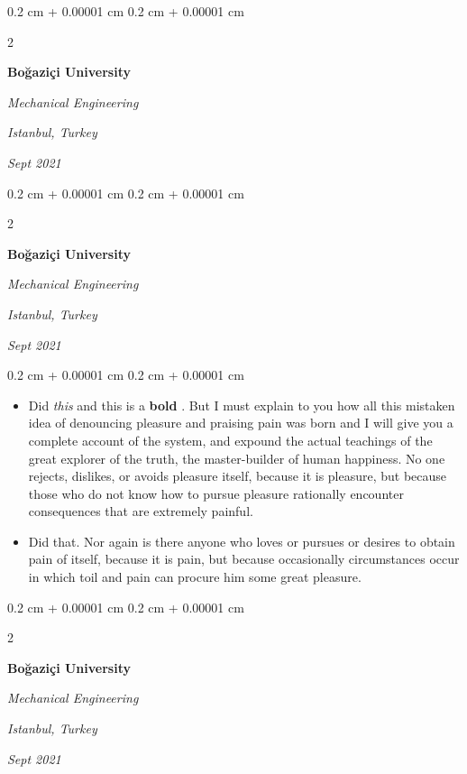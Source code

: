 \documentclass[10pt, letterpaper]{article}
\newenvironment{highlights}{
    \begin{itemize}[
        topsep=0.10 cm,
        parsep=0.10 cm,
        partopsep=0pt,
        itemsep=0pt,
        leftmargin=0.4 cm + 10pt
    ]
}{
    \end{itemize}
} %
\newenvironment{onecolentry}{
    \begin{adjustwidth}{
        0.2 cm + 0.00001 cm
    }{
        0.2 cm + 0.00001 cm
    }
}{
    \end{adjustwidth}
} %
\newenvironment{twocolentry}[2][]{
    \onecolentry
    \def\secondColumn{#2}
    \setcolumnwidth{\fill, 4.5 cm}
    \begin{paracol}{2}
}{
    \switchcolumn \raggedleft \secondColumn
    \end{paracol}
    \endonecolentry
} %
\let\hrefWithoutArrow\href
\renewcommand{\href}[2]{\hrefWithoutArrow{#1}{\ifthenelse{\equal{#2}{}}{ }{#2 }\raisebox{.15ex}{\footnotesize \faExternalLink*}}}
\begin{document}
        \vspace{0.2 cm}

        \begin{twocolentry}{
        \textit{Istanbul, Turkey}    
            
        \textit{Sept 2021}}
            \textbf{Boğaziçi University}

            \textit{Mechanical Engineering}
        \end{twocolentry}



        \vspace{0.2 cm}

        \begin{twocolentry}{
        \textit{Istanbul, Turkey}    
            
        \textit{Sept 2021}}
            \textbf{Boğaziçi University}

            \textit{Mechanical Engineering}
        \end{twocolentry}

        \vspace{0.10 cm}
        \begin{onecolentry}
            \begin{highlights}
                \item Did \textit{this} and this is a \textbf{bold} \href{https://example.com}{link}. But I must explain to you how all this mistaken idea of denouncing pleasure and praising pain was born and I will give you a complete account of the system, and expound the actual teachings of the great explorer of the truth, the master-builder of human happiness. No one rejects, dislikes, or avoids pleasure itself, because it is pleasure, but because those who do not know how to pursue pleasure rationally encounter consequences that are extremely painful.
                \item Did that. Nor again is there anyone who loves or pursues or desires to obtain pain of itself, because it is pain, but because occasionally circumstances occur in which toil and pain can procure him some great pleasure.
            \end{highlights}
        \end{onecolentry}


        \vspace{0.2 cm}

        \begin{twocolentry}{
        \textit{Istanbul, Turkey}    
            
        \textit{Sept 2021}}
            \textbf{Boğaziçi University}

            \textit{Mechanical Engineering}
        \end{twocolentry}
\end{document}
